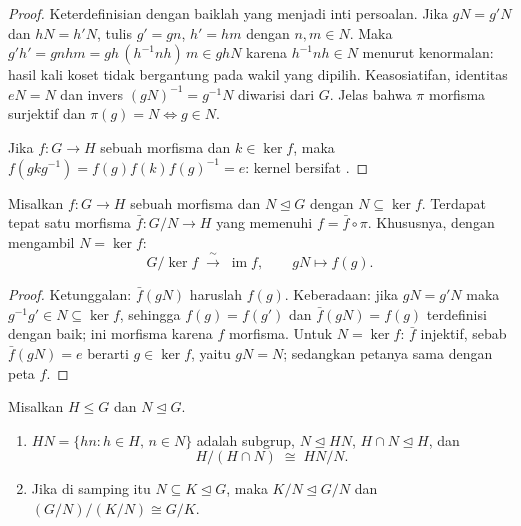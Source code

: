 \begin{proof}
Keterdefinisian dengan baiklah yang menjadi inti persoalan. Jika $gN = g'N$ dan $hN = h'N$,
tulis $g' = gn$, $h' = hm$ dengan $n, m \in N$. Maka $g'h' = gnhm =
gh\,(h^{-1}nh)\,m \in ghN$ karena $h^{-1}nh \in N$ menurut kenormalan:
hasil kali koset tidak bergantung pada wakil yang dipilih.
Keasosiatifan, identitas $eN = N$ dan invers $(gN)^{-1} = g^{-1}N$
diwarisi dari $G$. Jelas bahwa $\pi$ morfisma surjektif dan
$\pi(g) = N \iff g \in N$.

Jika $f \colon G \to H$ sebuah morfisma dan $k \in \ker f$, maka
$f(gkg^{-1}) = f(g)f(k)f(g)^{-1} = e$: kernel bersifat .
\end{proof}

\begin{theorem}
\label{thm:b3:groups:firstiso}
Misalkan $f \colon G \to H$ sebuah morfisma dan $N \trianglelefteq G$
dengan $N \subseteq \ker f$. Terdapat tepat satu morfisma $\bar f \colon G/N
\to H$ yang memenuhi $f = \bar f \circ \pi$. Khususnya, dengan mengambil $N = \ker
f$:
\[
G/\ker f \;\xrightarrow{\;\sim\;}\; \operatorname{im} f,
\qquad gN \mapsto f(g).
\]
\end{theorem}

\begin{proof}
Ketunggalan: $\bar f(gN)$ haruslah $f(g)$. Keberadaan: jika $gN = g'N$
maka $g^{-1}g' \in N \subseteq \ker f$, sehingga $f(g) = f(g')$ dan $\bar
f(gN) = f(g)$ terdefinisi dengan baik; ini morfisma karena $f$ morfisma. Untuk
$N = \ker f$: $\bar f$ injektif, sebab $\bar f(gN) = e$ berarti
$g \in \ker f$, yaitu $gN = N$; sedangkan petanya sama dengan peta $f$.
\end{proof}

\begin{theorem}
\label{thm:b3:groups:secondiso}
Misalkan $H \leq G$ dan $N \trianglelefteq G$.
\begin{enumerate}
  \item $HN = \{hn : h \in H,\, n \in N\}$ adalah subgrup, $N
        \trianglelefteq HN$, $H \cap N \trianglelefteq H$, dan
        \[
        H/(H \cap N) \;\cong\; HN/N .
        \]
  \item Jika di samping itu $N \subseteq K \trianglelefteq G$, maka $K/N
        \trianglelefteq G/N$ dan $(G/N)\big/(K/N) \cong G/K$.
\end{enumerate}
\end{theorem}

